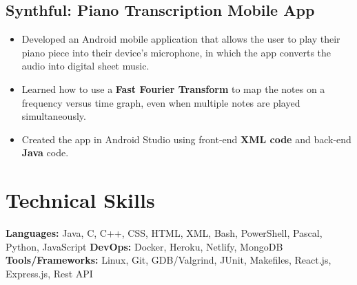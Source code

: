 \documentclass[a4,10pt]{article}
\newenvironment{zitemize}{
\begin{itemize}\itemsep0pt \parskip0pt \parsep1pt}
{\end{itemize}\vspace{-0.5cm}}
\begin{document}
\subsection*{Synthful: Piano Transcription Mobile App {\normalsize\normalfont} \hfill} 
\vspace{.02cm}
    \begin{zitemize}
        \item Developed an Android mobile application that allows the user to play their piano piece into their device's microphone, in which the app converts the audio into digital sheet music.
        \item Learned how to use a \textbf{Fast Fourier Transform} to map the notes on a frequency versus time graph, even when multiple notes are played simultaneously.
        \item Created the app in Android Studio using front-end \textbf{XML code} and back-end \textbf{Java} code.
    \end{zitemize}





\section{Technical Skills}
{\textbf{Languages:} Java, C, C++, CSS, HTML, XML, Bash, PowerShell, Pascal, Python, JavaScript
\newline
\textbf{DevOps:} Docker, Heroku, Netlify, MongoDB
\newline
\textbf{Tools/Frameworks:} Linux, Git, GDB/Valgrind, JUnit, Makefiles, React.js, Express.js, Rest API}
\vspace{-0.2cm}




\end{document}

